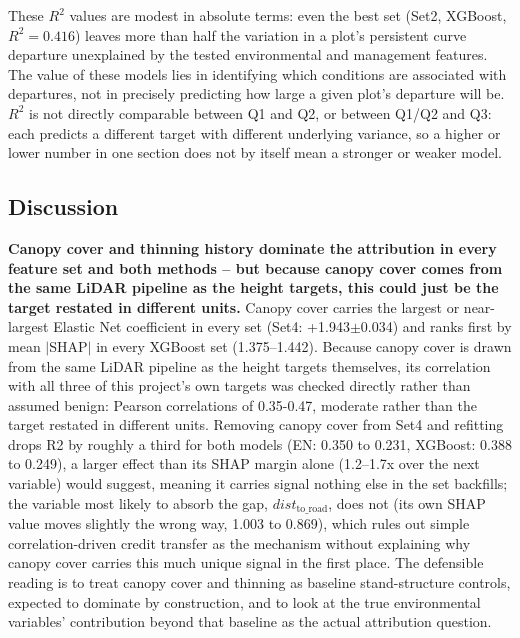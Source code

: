 \documentclass[logo,msc,ai]{infthesis}           %
\newcommand{\fig}[1]{\textcolor{purple}{[FIG: #1]}}
\begin{document}
These $R^2$ values are modest in absolute terms: even the best set (Set2, XGBoost, $R^2=0.416$) leaves more than half the variation in a plot's persistent curve departure unexplained by the tested environmental and management features. The value of these models lies in identifying which conditions are associated with departures, not in precisely predicting how large a given plot's departure will be. $R^2$ is not directly comparable between Q1 and Q2, or between Q1/Q2 and Q3: each predicts a different target with different underlying variance, so a higher or lower number in one section does not by itself mean a stronger or weaker model.

\subsection{Discussion}
\textbf{Canopy cover and thinning history dominate the attribution in every feature set and both methods -- but because canopy cover comes from the same LiDAR pipeline as the height targets, this could just be the target restated in different units.} Canopy cover carries the largest or near-largest Elastic Net coefficient in every set (Set4: +1.943$\pm$0.034) and ranks first by mean $|$SHAP$|$ in every XGBoost set (1.375--1.442). Because canopy cover is drawn from the same LiDAR pipeline as the height targets themselves, its correlation with all three of this project's own targets was checked directly rather than assumed benign: Pearson correlations of 0.35-0.47, moderate rather than the target restated in different units. Removing canopy cover from Set4 and refitting drops R2 by roughly a third for both models (EN: 0.350 to 0.231, XGBoost: 0.388 to 0.249), a larger effect than its SHAP margin alone (1.2--1.7x over the next variable) would suggest, meaning it carries signal nothing else in the set backfills; the variable most likely to absorb the gap, $\mathit{dist}_{\text{to\_road}}$, does not (its own SHAP value moves slightly the wrong way, 1.003 to 0.869), which rules out simple correlation-driven credit transfer as the mechanism without explaining why canopy cover carries this much unique signal in the first place. The defensible reading is to treat canopy cover and thinning as baseline stand-structure controls, expected to dominate by construction, and to look at the true environmental variables' contribution beyond that baseline as the actual attribution question. 
\end{document}

